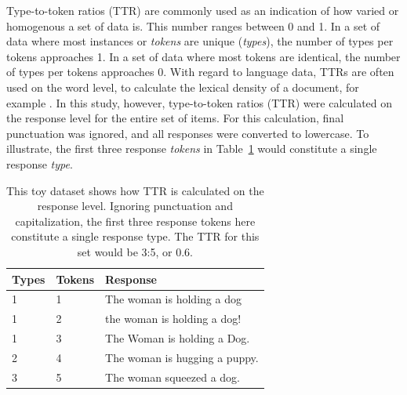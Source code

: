 Type-to-token ratios (TTR) are commonly used as an indication of how varied or homogenous a set of data is. This number ranges between 0 and 1. In a set of data where most instances or \textit{tokens} are unique (\textit{types}), the number of types per tokens approaches 1. In a set of data where most tokens are identical, the number of types per tokens approaches 0. With regard to language data, TTRs are often used on the word level, to calculate the lexical density of a document, for example \citep{granger2002computer}. In this study, however, type-to-token ratios (TTR) were calculated on the response level for the entire set of items. For this calculation, final punctuation was ignored, and all responses were converted to lowercase. To illustrate, the first three response \textit{tokens} in Table~\ref{tab:type-token-examples} would constitute a single response \textit{type}.

\begin{table}[htb!]
\begin{center}
\begin{tabular}{|l|l|l|}
\hline
Types & Tokens & Response \\
\hline
1 & 1 & The woman is holding a dog \\
\hline
1 & 2 & the woman is holding a dog! \\
\hline
1 & 3 & The Woman is holding a Dog. \\
\hline
2 & 4 & The woman is hugging a puppy. \\
\hline
3 & 5 & The woman squeezed a dog. \\
\hline
\end{tabular}
\caption{\label{tab:type-token-examples} This toy dataset shows how TTR is calculated on the response level. Ignoring punctuation and capitalization, the first three response tokens here constitute a single response type. The TTR for this set would be 3:5, or 0.6.}
\end{center}
\end{table}


